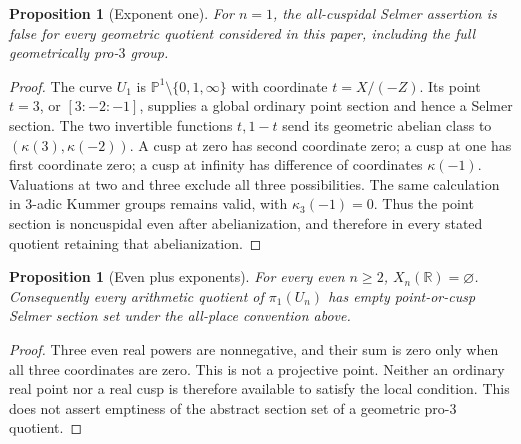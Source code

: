 \documentclass[11pt]{article}
\newtheorem{proposition}[theorem]{Proposition}
\theoremstyle{definition}
\begin{document}
\begin{proposition}[Exponent one]\label{prop:one}
For $n=1$, the all-cuspidal Selmer assertion is false for every
geometric quotient considered in this paper, including the full
geometrically pro-$3$ group.
\end{proposition}
\begin{proof}
The curve $U_1$ is $\mathbb P^1\setminus\{0,1,\infty\}$ with
coordinate $t=X/(-Z)$. Its point $t=3$, or $[3:-2:-1]$, supplies
a global ordinary point section and hence a Selmer section. The
two invertible functions $t,1-t$ send its geometric abelian class
to $(\kappa(3),\kappa(-2))$. A cusp at zero has second coordinate
zero; a cusp at one has first coordinate zero; a cusp at infinity
has difference of coordinates $\kappa(-1)$. Valuations at two and
three exclude all three possibilities. The same calculation in
$3$-adic Kummer groups remains valid, with $\kappa_3(-1)=0$.
Thus the point section is noncuspidal even after abelianization,
and therefore in every stated quotient retaining that abelianization.
\end{proof}

\begin{proposition}[Even plus exponents]\label{prop:even-plus}
For every even $n\geq2$, $X_n(\mathbb R)=\varnothing$. Consequently
every arithmetic quotient of $\pi_1(U_n)$ has empty point-or-cusp
Selmer section set under the all-place convention above.
\end{proposition}
\begin{proof}
Three even real powers are nonnegative, and their sum is zero only
when all three coordinates are zero. This is not a projective point.
Neither an ordinary real point nor a real cusp is therefore available
to satisfy the local condition. This does not assert emptiness of
the abstract section set of a geometric pro-$3$ quotient.
\end{proof}
\end{document}
